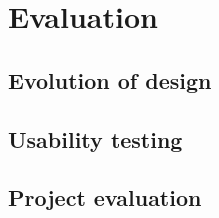 \chapter{Evaluation}

\section{Evolution of design}


\section{Usability testing}

\section{Project evaluation}

